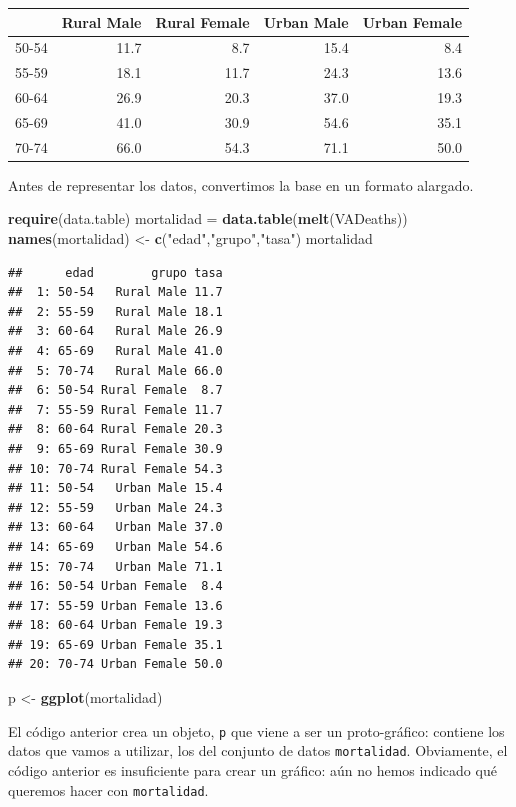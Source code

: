\documentclass[]{article}
\newenvironment{Shaded}{\begin{snugshade}}{\end{snugshade}}
\newcommand{\KeywordTok}[1]{\textcolor[rgb]{0.13,0.29,0.53}{\textbf{#1}}}
\newcommand{\NormalTok}[1]{#1}
\newcommand{\StringTok}[1]{\textcolor[rgb]{0.31,0.60,0.02}{#1}}
\numberwithin{ejcnt}{section}
\begin{document}
\begin{tabular}{lrrrr}
\toprule
  & Rural Male & Rural Female & Urban Male & Urban Female\\
\midrule
50-54 & 11.7 & 8.7 & 15.4 & 8.4\\
55-59 & 18.1 & 11.7 & 24.3 & 13.6\\
60-64 & 26.9 & 20.3 & 37.0 & 19.3\\
65-69 & 41.0 & 30.9 & 54.6 & 35.1\\
70-74 & 66.0 & 54.3 & 71.1 & 50.0\\
\bottomrule
\end{tabular}

Antes de representar los datos, convertimos la base en un formato alargado.

\begin{Shaded}
\begin{Highlighting}[]
\KeywordTok{require}\NormalTok{(data.table)}
\NormalTok{mortalidad =}\StringTok{ }\KeywordTok{data.table}\NormalTok{(}\KeywordTok{melt}\NormalTok{(VADeaths))}
\KeywordTok{names}\NormalTok{(mortalidad) <-}\StringTok{ }\KeywordTok{c}\NormalTok{(}\StringTok{"edad"}\NormalTok{,}\StringTok{"grupo"}\NormalTok{,}\StringTok{"tasa"}\NormalTok{)}
\NormalTok{mortalidad}
\end{Highlighting}
\end{Shaded}

\begin{verbatim}
##      edad        grupo tasa
##  1: 50-54   Rural Male 11.7
##  2: 55-59   Rural Male 18.1
##  3: 60-64   Rural Male 26.9
##  4: 65-69   Rural Male 41.0
##  5: 70-74   Rural Male 66.0
##  6: 50-54 Rural Female  8.7
##  7: 55-59 Rural Female 11.7
##  8: 60-64 Rural Female 20.3
##  9: 65-69 Rural Female 30.9
## 10: 70-74 Rural Female 54.3
## 11: 50-54   Urban Male 15.4
## 12: 55-59   Urban Male 24.3
## 13: 60-64   Urban Male 37.0
## 14: 65-69   Urban Male 54.6
## 15: 70-74   Urban Male 71.1
## 16: 50-54 Urban Female  8.4
## 17: 55-59 Urban Female 13.6
## 18: 60-64 Urban Female 19.3
## 19: 65-69 Urban Female 35.1
## 20: 70-74 Urban Female 50.0
\end{verbatim}

\begin{Shaded}
\begin{Highlighting}[]
\NormalTok{p <-}\StringTok{ }\KeywordTok{ggplot}\NormalTok{(mortalidad)}
\end{Highlighting}
\end{Shaded}

El código anterior crea un objeto, \texttt{p} que viene a ser un proto-gráfico: contiene los datos que vamos a utilizar, los del conjunto de datos \texttt{mortalidad}. Obviamente, el código anterior es insuficiente para crear un gráfico: aún no hemos indicado qué queremos hacer con \texttt{mortalidad}.
\end{document}
